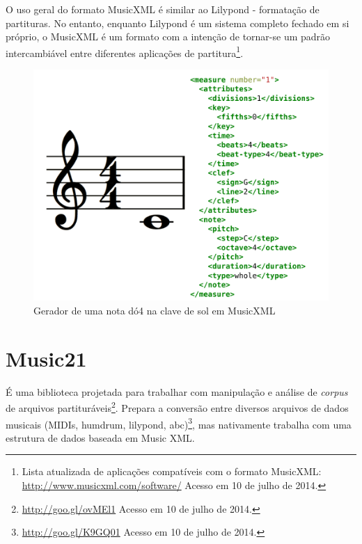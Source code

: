 \documentclass[
	12pt,				%
	openright,			%
	twoside,			%
	a4paper,			%
	english,			%
	french,				%
	spanish,			%
	brazil				%
	]{abntex2}
\begin{document}
O uso geral do formato MusicXML é similar ao Lilypond - formatação de partituras. No entanto, enquanto Lilypond é um sistema completo fechado em si próprio, o MusicXML é um formato com a intenção de tornar-se um padrão intercambiável entre diferentes aplicações de partitura\footnote{ Lista atualizada de aplicações compatíveis com o formato MusicXML: \url{http://www.musicxml.com/software/} Acesso em 10 de julho de 2014.}.


\begin{figure}[htb]
	\caption{\label{fig_grafico}Gerador de uma nota dó4 na clave de sol em MusicXML}
	\begin{center}
	    \includegraphics[scale=0.5]{score/musicxml.pdf}
	\end{center}
\end{figure}


\section{Music21}
\label{m21}

É uma biblioteca projetada para trabalhar com manipulação e análise de \textit{corpus} de arquivos partituráveis\footnote{\url{http://goo.gl/ovMEl1} Acesso em 10 de julho de 2014.}. Prepara a conversão entre diversos arquivos de dados musicais (MIDIs, humdrum, lilypond, abc)\footnote{\url{http://goo.gl/K9GQ01} Acesso em 10 de julho de 2014.}, mas nativamente trabalha com uma estrutura de dados baseada em Music XML.
\end{document}
